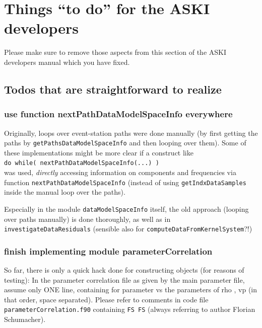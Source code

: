 \documentclass[12pt,a4paper]{article}
\newcommand{\lcode}[1]{\nolinkurl{#1}}
\newcommand{\lcodetitle}[1]{ {\ttfamily #1} }
\newcommand{\ASKI}{ {\ttfamily ASKI} }
\begin{document}
\section{Things ``to do'' for the \ASKI{} developers} \label{sec:todo}
Please make sure to remove those aspects from this section of the \ASKI{} developers manual which you have fixed.

\subsection{Todos that are straightforward to realize} \label{ssec-todo:todo-simple}

\subsubsection{use function \lcodetitle{nextPathDataModelSpaceInfo} everywhere}
%
Originally, loops over event-station paths were done manually (by first getting the paths by 
\lcode{getPathsDataModelSpaceInfo} and then looping over them). Some of these implementations might
be more clear if a construct like\\
\lcode{do while( nextPathDataModelSpaceInfo(...) )}\\
was used, \emph{directly} accessing information on components and frequencies via function 
\lcode{nextPathDataModelSpaceInfo} (instead of using \lcode{getIndxDataSamples} inside the manual loop 
over the paths).

Especially in the module \lcode{dataModelSpaceInfo} itself, the old approach (looping over paths manually) is
done thoroughly, as well as in \lcode{investigateDataResiduals} (sensible also for 
\lcode{computeDataFromKernelSystem}?!)

\subsubsection{finish implementing module \lcodetitle{parameterCorrelation}}
%
So far, there is only a quick hack done for constructing objects (for reasons of testing):
In the parameter correlation file as given by the main parameter file, assume only ONE line, 
containing for parameter vs the parameters of  rho , vp (in that order, space separated).
Please refer to comments in code file \lcode{parameterCorrelation.f90} containing \lcode{FS FS}
(always referring to author Florian Schumacher).
\end{document}

